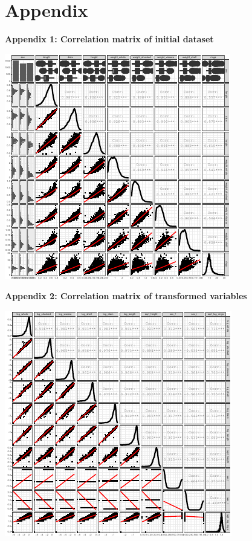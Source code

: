 \documentclass[letterpaper,9pt,twocolumn,twoside,]{pinp}
\begin{document}
\hypertarget{appendix}{%
\section{Appendix}\label{appendix}}

\textbf{Appendix 1: Correlation matrix of initial dataset}

\begin{center}\includegraphics{ExecSum_files/figure-latex/unnamed-chunk-10-1} \end{center}

\textbf{Appendix 2: Correlation matrix of transformed variables}

\begin{center}\includegraphics{ExecSum_files/figure-latex/unnamed-chunk-11-1} \end{center}
\end{document}
